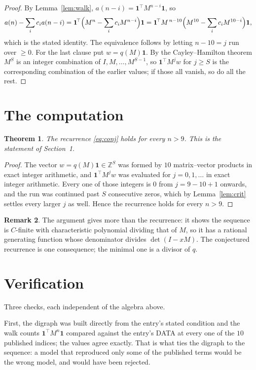 \documentclass[11pt,a4paper]{article}
\theoremstyle{plain}
\newtheorem{theorem}{Theorem}
\theoremstyle{definition}
\newtheorem{remark}[theorem]{Remark}
\begin{document}
\begin{proof}
By Lemma~\ref{lem:walk}, $a(n-i)=\mathbf{1}^{\!\top}M^{n-i}\mathbf{1}$, so
\[
a(n)-\sum_i c_i a(n-i)
=\mathbf{1}^{\!\top}\Bigl(M^{n}-\sum_i c_i M^{n-i}\Bigr)\mathbf{1}
=\mathbf{1}^{\!\top}M^{\,n-10}\Bigl(M^{10}-\sum_i c_i M^{10-i}\Bigr)\mathbf{1},
\]
which is the stated identity. The equivalence follows by letting $n-10=j$ run over
$\ge0$. For the last clause put $w=q(M)\mathbf{1}$. By the Cayley--Hamilton theorem
$M^{S}$ is an integer combination of $I,M,\dots,M^{S-1}$, so
$\mathbf{1}^{\!\top}M^{j}w$ for $j\ge S$ is the corresponding combination of the
earlier values; if those all vanish, so do all the rest.
\end{proof}

\section{The computation}

\begin{theorem}
The recurrence \eqref{eq:conj} holds for every $n>9$. This is the statement of
Section~1.
\end{theorem}

\begin{proof}
The vector $w=q(M)\mathbf{1}\in\mathbb{Z}^{S}$ was formed by $10$ matrix--vector
products in exact integer arithmetic, and $\mathbf{1}^{\!\top}M^{j}w$ was evaluated for
$j=0,1,\dots$ in exact integer arithmetic. Every one of those integers is $0$ from
$j=9-10+1$ onwards, and the run was continued past $S$ consecutive zeros, which by
Lemma~\ref{lem:crit} settles every larger $j$ as well. Hence the recurrence holds for
every $n>9$.
\end{proof}

\begin{remark}
The argument gives more than the recurrence: it shows the sequence is $C$-finite with
characteristic polynomial dividing that of $M$, so it has a rational generating function
whose denominator divides $\det(I-xM)$. The conjectured recurrence is one consequence; the
minimal one is a divisor of $q$.
\end{remark}

\section{Verification}

Three checks, each independent of the algebra above.

First, the digraph was built directly from the entry's stated condition and the walk counts
$\mathbf{1}^{\!\top}M^{n}\mathbf{1}$ compared against the entry's DATA at every one of
the $10$ published indices; the values agree exactly. That is what ties the digraph to
the sequence: a model that reproduced only some of the published terms would be the wrong
model, and would have been rejected.
\end{document}
